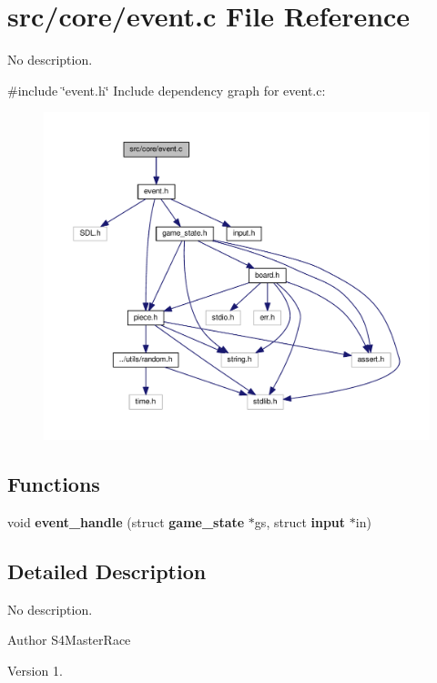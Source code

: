 \section{src/core/event.c File Reference}
\label{event_8c}


No description.  


{\ttfamily \#include \char`\"{}event.\+h\char`\"{}}\newline
Include dependency graph for event.\+c\+:
\nopagebreak
\begin{figure}[H]
\begin{center}
\leavevmode
\includegraphics[width=350pt]{event_8c__incl}
\end{center}
\end{figure}
\subsection*{Functions}
\begin{DoxyCompactItemize}
\item 
void \textbf{ event\+\_\+handle} (struct \textbf{ game\+\_\+state} $\ast$gs, struct \textbf{ input} $\ast$in)
\end{DoxyCompactItemize}


\subsection{Detailed Description}
No description. 

\begin{DoxyAuthor}{Author}
S4\+Master\+Race 
\end{DoxyAuthor}
\begin{DoxyVersion}{Version}
1. 
\end{DoxyVersion}


